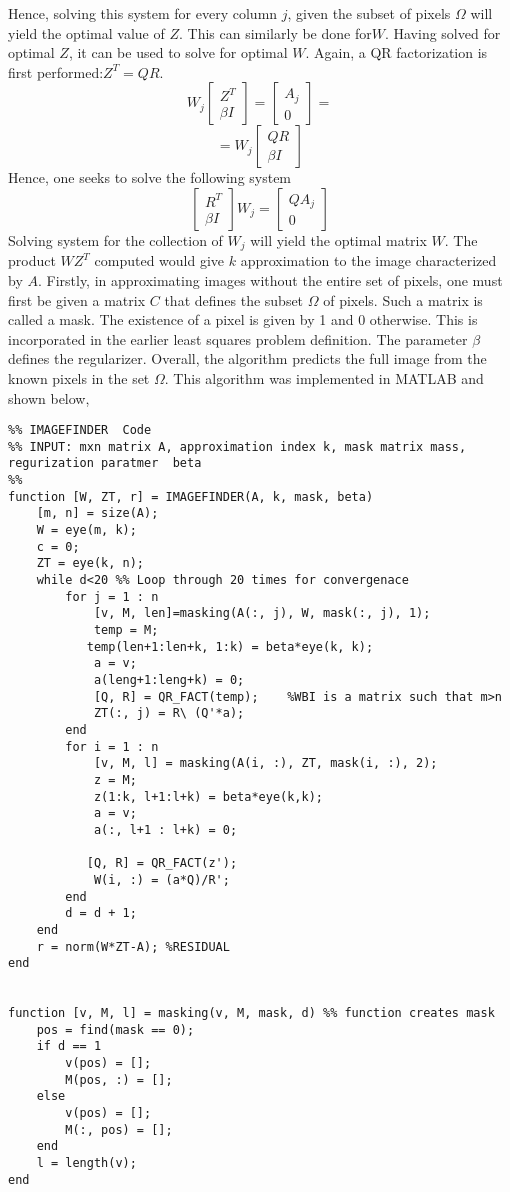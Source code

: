 \documentclass{article}
\begin{document}
Hence, solving this system for every column $j$, given the subset of pixels $\Omega$ will yield the optimal value of $Z$. This can similarly be done for$W$. Having solved for optimal $Z$, it can be used to solve for optimal $W$. Again, a QR factorization is first performed:$ Z^{T} =QR$. 
\newline 
$$W_{j}  \begin{bmatrix} Z^{T} \\ \beta I\end{bmatrix}=\begin{bmatrix} A_{j}\\ 0\end{bmatrix} =  
$$ 
$$ =   W_{j}\begin{bmatrix} QR \\ \beta I\end{bmatrix} $$ 
Hence, one seeks to solve the following system 
$$ \begin{bmatrix} R^{T} \\ \beta I\end{bmatrix}W_{j} =  \begin{bmatrix} QA_{j}\\ 0\end{bmatrix}  $$ 
Solving system for the collection of $W_{j}$ will yield the optimal matrix $W$. The product $WZ^{T}$ computed would give $k$ approximation to the image characterized by $A$. Firstly, in approximating images without the entire set of pixels, one must first be given a matrix $C$ that defines the subset $\Omega$ of pixels. Such a matrix is called a mask. The existence of a pixel is given by 1 and 0 otherwise. This is incorporated in the earlier least squares problem definition. The parameter $\beta$ defines the regularizer. Overall, the algorithm predicts the full image from the known pixels in the set $\Omega$.  
This algorithm was implemented in MATLAB and shown below, 
\begin{lstlisting}
%% IMAGEFINDER  Code 
%% INPUT: mxn matrix A, approximation index k, mask matrix mass, regurization paratmer  beta
%%
function [W, ZT, r] = IMAGEFINDER(A, k, mask, beta)
    [m, n] = size(A);
    W = eye(m, k);
    c = 0;
    ZT = eye(k, n);
    while d<20 %% Loop through 20 times for convergenace 
        for j = 1 : n
            [v, M, len]=masking(A(:, j), W, mask(:, j), 1);
            temp = M;
           temp(len+1:len+k, 1:k) = beta*eye(k, k);
            a = v;
            a(leng+1:leng+k) = 0;
            [Q, R] = QR_FACT(temp);    %WBI is a matrix such that m>n  
            ZT(:, j) = R\ (Q'*a);
        end  
        for i = 1 : n
            [v, M, l] = masking(A(i, :), ZT, mask(i, :), 2);
            z = M;
            z(1:k, l+1:l+k) = beta*eye(k,k);      
            a = v;
            a(:, l+1 : l+k) = 0;
           
           [Q, R] = QR_FACT(z');
            W(i, :) = (a*Q)/R';
        end
        d = d + 1;
    end
    r = norm(W*ZT-A); %RESIDUAL 
end


function [v, M, l] = masking(v, M, mask, d) %% function creates mask 
    pos = find(mask == 0);
    if d == 1
        v(pos) = [];
        M(pos, :) = [];
    else
        v(pos) = [];
        M(:, pos) = [];
    end
    l = length(v);
end
\end{lstlisting} 
\end{document}
